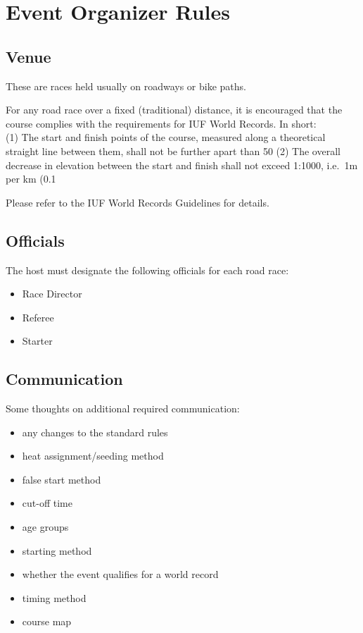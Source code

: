\chapter{Event Organizer Rules}

\section{Venue}

These are races held usually on roadways or bike paths.

For any road race over a fixed (traditional) distance, it is encouraged that the course complies with the requirements for IUF World Records.
In short: \\
(1) The start and finish points of the course, measured along a theoretical straight line between them, shall not be further apart than 50%
(2) The overall decrease in elevation between the start and finish shall not exceed 1:1000, i.e.\ 1m per km (0.1%

Please refer to the IUF World Records Guidelines for details.

\section{Officials}

The host must designate the following officials for each road race:
\begin{itemize}
\item Race Director
\item Referee
\item Starter
\end{itemize}

\section{Communication}

\begin{comment2016}
Some thoughts on additional required communication:
\begin{itemize}
\item any changes to the standard rules
\item heat assignment/seeding method
\item false start method
\item cut-off time
\item age groups
\item starting method
\item whether the event qualifies for a world record
\item timing method
\item course map
\end{itemize}
\end{comment2016}

